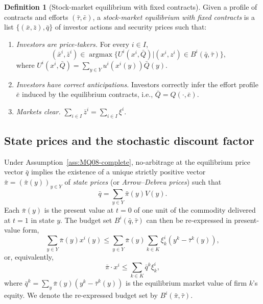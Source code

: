 \documentclass[11pt,a4paper,oneside]{book}
\def\leq{\leqslant}
\DeclareMathOperator*{\argmax}{argmax}
\theoremstyle{plain}
\theoremstyle{definition}
\newtheorem{definition}[theorem]{Definition}
\theoremstyle{remark}
\numberwithin{equation}{chapter}
\begin{document}
\begin{definition}[Stock-market equilibrium with fixed contracts]\label{def:MQ08-fixed-eq}
Given a profile of contracts and efforts $(\bar{\tau}, \bar{e})$, a \emph{stock-market equilibrium with fixed contracts} is a list $\{ (\bar{x}, \bar{z}), \bar{q} \}$ of investor actions and security prices such that:
\begin{enumerate}
  \item[(a)] \emph{Investors are price-takers.}
  For every $i \in I$,
  \begin{equation*}
    (\bar{x}^i, \bar{z}^i) \in \argmax \bigl\{ U^i(x^i, \bar{Q}) \vert (x^i, z^i) \in B^i(\bar{q}, \bar{\tau}) \bigr\},
  \end{equation*}
  where $U^i(x^i, \bar{Q}) = \sum_{y \in Y} u^i(x^i(y)) \bar{Q}(y)$.
  \item[(b)] \emph{Investors have correct anticipations.}
  Investors correctly infer the effort profile $\bar{e}$ induced by the equilibrium contracts, i.e., $\bar{Q} = Q(\cdot, \bar{e})$.
  \item[(c)] \emph{Markets clear.}
  $\sum_{i \in I} \bar{z}^i = \sum_{i \in I} \xi^i$.
\end{enumerate}
\end{definition}

\subsection{State prices and the stochastic discount factor}

Under Assumption~\ref{ass:MQ08-complete}, no-arbitrage at the equilibrium price vector $\bar{q}$ implies the existence of a unique strictly positive vector $\bar{\pi} = (\bar{\pi}(y))_{y \in Y}$ of \emph{state prices} (or \emph{Arrow--Debreu prices}) such that
\begin{equation}\label{eq:MQ08-state-prices}
  \bar{q} = \sum_{y \in Y} \bar{\pi}(y) V(y).
\end{equation}
Each $\bar{\pi}(y)$ is the present value at $t=0$ of one unit of the commodity delivered at $t=1$ in state $y$.
The budget set $B^i(\bar{q}, \bar{\tau})$ can then be re-expressed in present-value form,
\begin{equation}\label{eq:budget-PV}
  \sum_{y \in Y} \bar{\pi}(y) x^i(y)
  \leq
  \sum_{y \in Y} \bar{\pi}(y) \sum_{k \in K} \xi^i_k (y^k - \bar{\tau}^k(y)),
\end{equation}
or, equivalently,
\begin{equation*}
  \bar{\pi} \cdot x^i \leq \sum_{k \in K} \bar{q}^k \xi^i_k,
\end{equation*}
where $\bar{q}^k = \sum_{y} \bar{\pi}(y) (y^k - \bar{\tau}^k(y))$ is the equilibrium market value of firm $k$'s equity.
We denote the re-expressed budget set by $B^i(\bar{\pi}, \bar{\tau})$.
\end{document}
